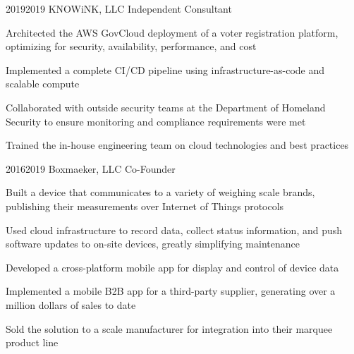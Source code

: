 \job
  {2019}{2019}
  {KNOWiNK, LLC}
  {Independent Consultant}
  {\begin{achievements}
    \item Architected the AWS GovCloud deployment of a voter registration platform, optimizing for security, availability, performance, and cost
    \item Implemented a complete CI/CD pipeline using infrastructure-as-code and scalable compute
    \item Collaborated with outside security teams at the Department of Homeland Security to ensure monitoring and compliance requirements were met
    \item Trained the in-house engineering team on cloud technologies and best practices
  \end{achievements}}

\job
  {2016}{2019}
  {Boxmaeker, LLC}
  {Co-Founder}
  {\begin{achievements}
    \item Built a device that communicates to a variety of weighing scale brands, publishing their measurements over Internet of Things protocols
    \item Used cloud infrastructure to record data, collect status information, and push software updates to on-site devices, greatly simplifying maintenance
    \item Developed a cross-platform mobile app for display and control of device data
    \item Implemented a mobile B2B app for a third-party supplier, generating over a million dollars of sales to date
    \item Sold the solution to a scale manufacturer for integration into their marquee product line
  \end{achievements}}
